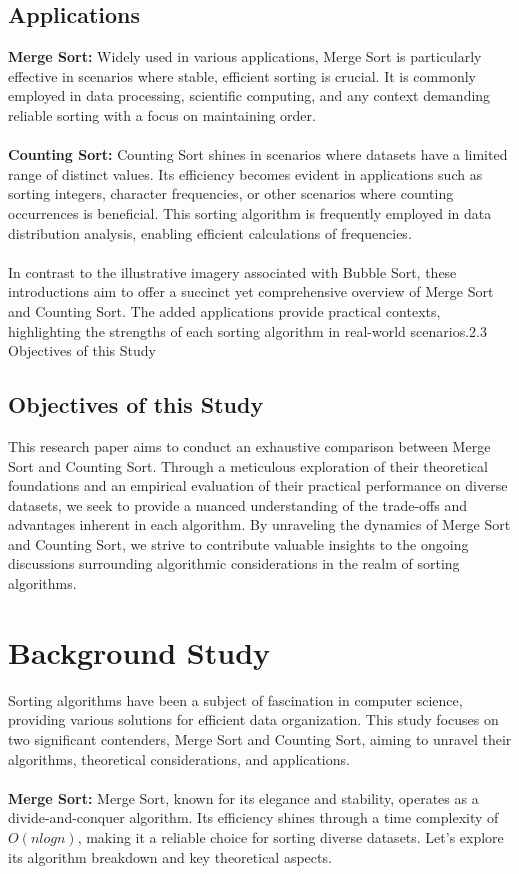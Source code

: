 \documentclass[12pt,twocolumn]{article}
\begin{document}
\subsection{Applications}
\textbf{Merge Sort:} Widely used in various applications, Merge Sort is particularly effective in scenarios where stable, efficient sorting is crucial. It is commonly employed in data processing, scientific computing, and any context demanding reliable sorting with a focus on maintaining order.
\\
\\
\textbf{Counting Sort:} Counting Sort shines in scenarios where datasets have a limited range of distinct values. Its efficiency becomes evident in applications such as sorting integers, character frequencies, or other scenarios where counting occurrences is beneficial. This sorting algorithm is frequently employed in data distribution analysis, enabling efficient calculations of frequencies.
\\
\\
In contrast to the illustrative imagery associated with Bubble Sort, these introductions aim to offer a succinct yet comprehensive overview of Merge Sort and Counting Sort. The added applications provide practical contexts, highlighting the strengths of each sorting algorithm in real-world scenarios.2.3 Objectives of this Study

\subsection{Objectives of this Study}
This research paper aims to conduct an exhaustive comparison between Merge Sort and Counting Sort. Through a meticulous exploration of their theoretical foundations and an empirical evaluation of their practical performance on diverse datasets, we seek to provide a nuanced understanding of the trade-offs and advantages inherent in each algorithm. By unraveling the dynamics of Merge Sort and Counting Sort, we strive to contribute valuable insights to the ongoing discussions surrounding algorithmic considerations in the realm of sorting algorithms.

\section{Background Study}
Sorting algorithms have been a subject of fascination in computer science, providing various solutions for efficient data organization. This study focuses on two significant contenders, Merge Sort and Counting Sort, aiming to unravel their algorithms, theoretical considerations, and applications.
\\
\\
\textbf{Merge Sort:}
Merge Sort, known for its elegance and stability, operates as a divide-and-conquer algorithm. Its efficiency shines through a time complexity of \(O(n log n)\), making it a reliable choice for sorting diverse datasets. Let's explore its algorithm breakdown and key theoretical aspects.
\cite{geeksforgeeks-merge-sort}
\\
\\
\end{document}
